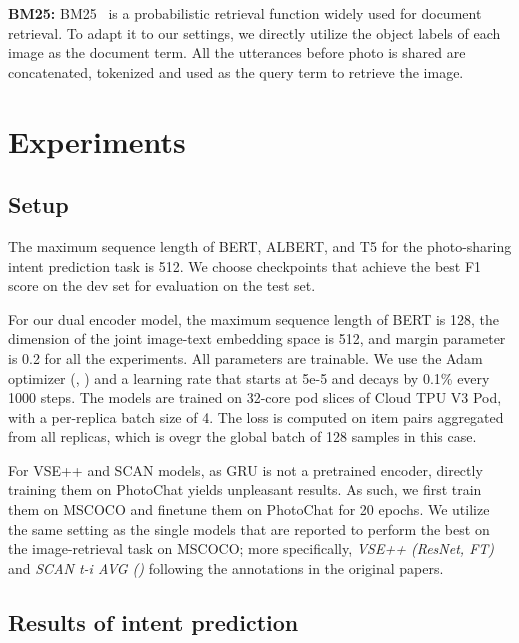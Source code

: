\documentclass[11pt,a4paper]{article}
\begin{document}
\textbf{BM25:} BM25~\cite{Amati2009} is a probabilistic retrieval function widely used for document retrieval. To adapt it to our settings, we directly utilize the object labels of each image  as the document term. All the utterances before photo is shared are concatenated, tokenized and used as the query term to retrieve the image.

\section{Experiments}

\subsection{Setup}
The maximum sequence length of BERT, ALBERT, and T5 for the photo-sharing intent prediction task is 512. We choose checkpoints that achieve the best F1 score on the dev set for evaluation on the test set.

For our dual encoder model, the maximum sequence length of BERT is 128, the dimension of the joint image-text embedding space  is 512, and margin parameter  is 0.2 for all the experiments. All parameters are trainable. We use the Adam optimizer (, ) and a learning rate
that starts at 5e-5 and decays by 0.1\% every 1000
steps. 
The models are trained on 32-core pod slices of Cloud TPU V3 Pod, with a per-replica batch size of 4. The loss is computed on item pairs
aggregated from all replicas, which is ovegr the
global batch of 128 samples in this case.

For VSE++ and SCAN models, as GRU is not a pretrained encoder, directly training them on PhotoChat yields unpleasant results. As such, we first train them on MSCOCO and finetune them on PhotoChat for 20 epochs. We utilize the same setting as the single models that are reported to perform the best on the image-retrieval task on MSCOCO; more specifically, \textit{VSE++ (ResNet, FT)} and \textit{SCAN t-i AVG ()} following the annotations in the original papers. 







\subsection{Results of intent prediction}
\end{document}
